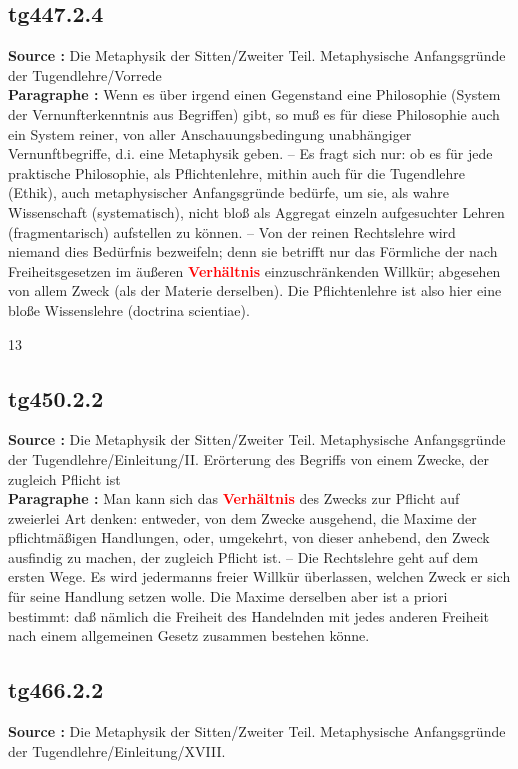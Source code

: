 \documentclass[a4paper,12pt,twoside]{book}
\newcommand{\match}[1]{\textcolor{red}{\textbf{#1}}}
\begin{document}
	\subsection*{tg447.2.4} 
	\textbf{Source : }Die Metaphysik der Sitten/Zweiter Teil. Metaphysische Anfangsgründe der Tugendlehre/Vorrede\\  
	
	\textbf{Paragraphe : }Wenn es über irgend einen Gegenstand eine Philosophie (System der Vernunfterkenntnis aus Begriffen) gibt, so muß es für diese Philosophie auch ein System reiner, von aller Anschauungsbedingung unabhängiger Vernunftbegriffe, d.i. eine Metaphysik geben. – Es fragt sich nur: ob es für jede praktische Philosophie, als Pflichtenlehre, mithin auch für die Tugendlehre (Ethik), auch metaphysischer Anfangsgründe bedürfe, um sie, als wahre Wissenschaft (systematisch), nicht bloß als Aggregat einzeln aufgesuchter Lehren (fragmentarisch) aufstellen zu können. – Von der reinen Rechtslehre wird niemand dies Bedürfnis bezweifeln; denn sie betrifft nur das Förmliche der nach Freiheitsgesetzen im äußeren \match{Verhältnis} einzuschränkenden Willkür; abgesehen von allem Zweck (als der Materie derselben). Die Pflichtenlehre ist also hier eine bloße Wissenslehre (doctrina scientiae).
	
	
	13
	
	
	
	\subsection*{tg450.2.2} 
	\textbf{Source : }Die Metaphysik der Sitten/Zweiter Teil. Metaphysische Anfangsgründe der Tugendlehre/Einleitung/II. Erörterung des Begriffs von einem Zwecke, der zugleich Pflicht ist\\  
	
	\textbf{Paragraphe : }Man kann sich das \match{Verhältnis} des Zwecks zur Pflicht auf zweierlei Art denken: entweder, von dem Zwecke ausgehend, die Maxime der pflichtmäßigen Handlungen, oder, umgekehrt, von dieser anhebend, den Zweck ausfindig zu machen, der zugleich Pflicht ist. – Die Rechtslehre geht auf dem ersten Wege. Es wird jedermanns freier Willkür überlassen, welchen Zweck er sich für seine Handlung setzen wolle. Die Maxime derselben aber ist a priori bestimmt: daß nämlich die Freiheit des Handelnden mit jedes anderen Freiheit nach einem allgemeinen Gesetz zusammen bestehen könne. 
	
	\subsection*{tg466.2.2} 
	\textbf{Source : }Die Metaphysik der Sitten/Zweiter Teil. Metaphysische Anfangsgründe der Tugendlehre/Einleitung/XVIII.\\  
	
\end{document}
